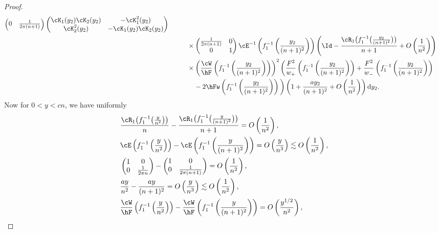 \begin{proof}
\begin{align}
\begin{pmatrix}
 0 & \frac{1}{2\pi (n+1)}
 \end{pmatrix}
 \begin{pmatrix}
 \cK_1(y_2)\cK_2(y_2) & -\cK^2_1(y_2)
 \\
 \cK^2_2(y_2) & -\cK_1(y_2)\cK_2(y_2)
 \end{pmatrix}
\nonumber
 \\
 &\phantom{\qquad=}{}\times \begin{pmatrix}
 \frac{1}{2\pi (n+1)} & 0
 \\
 0 & 1
 \end{pmatrix}
\cE^{-1}\left(f_1^{-1}\left(\frac{y_2}{(n+1)^2}\right)\right)\left( \Id - \frac{\cR_1\big(f_1^{-1}\big(\frac{y_2}{(n+1)^2}\big)\big)}{n+1}+ O\left( \frac{1}{n^2} \right)\right)\nonumber
 \\
 &\phantom{\qquad=}{}\times
 \left(\frac{\cW}{\hF}\left(f_1^{-1}\left(\frac{y_2}{(n+1)^2}\right)\right)\right)^2\bigg(\frac{F^2}{w_+}\left(f_1^{-1}\left(\frac{y_2}{(n+1)^2}\right)\right)+\frac{F^2}{w_-}\left(f_1^{-1}\left(\frac{y_2}{(n+1)^2}\right)\right)
\nonumber \\
 &\phantom{\qquad=\times}{}-2\hFw\left(f_1^{-1}\left(\frac{y_2}{(n+1)^2}\right)\right)\bigg) \left(1 + \frac{ay_2}{(n+1)^2} + O\left(\frac{1}{n^2}\right)\right){\rm d}y_2.\label{LongExp2}
 \end{align}
Now for $0< y < cn$, we have uniformly
\begin{align*}
& \frac{\cR_1\big(f_1^{-1}\big(\frac{y}{n^2}\big)\big)}{n} - \frac{\cR_1\big(f_1^{-1}\big(\frac{y}{(n+1)^2}\big)\big)}{n+1}= O\left(\frac{1}{n^2}\right),
 \\
& \cE\left(f_1^{-1}\left(\frac{y}{n^2}\right)\right) - \cE\left(f_1^{-1}\left(\frac{y}{(n+1)^2}\right)\right)= O\left(\frac{y}{n^3}\right) \lesssim O\left(\frac{1}{n^2}\right),
 \\
& \begin{pmatrix}
 1 & 0
 \\
 0 & \frac{1}{2\pi n}
 \end{pmatrix} - \begin{pmatrix}
 1 & 0
 \\
 0 & \frac{1}{2\pi (n+1)}
 \end{pmatrix}= O\left(\frac{1}{n^2}\right),
 \\
 &\frac{ay}{n^2}-\frac{ay}{(n+1)^2}= O\left( \frac{y}{n^3}\right) \lesssim O\left(\frac{1}{n^2}\right),
 \\
& \frac{\cW}{\hF}\left(f_1^{-1}\left(\frac{y}{n^2}\right)\right) - \frac{\cW}{\hF}\left(f_1^{-1}\left(\frac{y}{(n+1)^2}\right)\right)= O\left(\frac{y^{1/2}}{n^2}\right),

\end{align*}
\end{proof}
